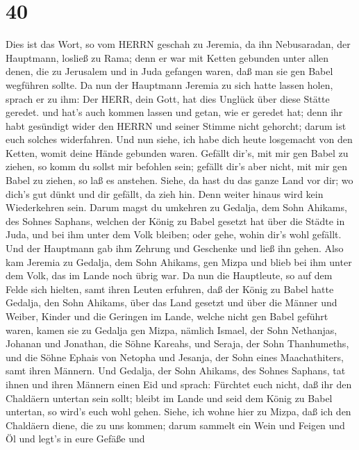 \hypertarget{section-39}{%
\section{40}\label{section-39}}

 Dies ist das Wort, so vom HERRN geschah zu Jeremia, da ihn
Nebusaradan, der Hauptmann, losließ zu Rama; denn er war mit Ketten
gebunden unter allen denen, die zu Jerusalem und in Juda gefangen waren,
daß man sie gen Babel wegführen sollte.  Da nun der
Hauptmann Jeremia zu sich hatte lassen holen, sprach er zu ihm: Der
HERR, dein Gott, hat dies Unglück über diese Stätte geredet.
 und hat's auch kommen lassen und getan, wie er geredet hat;
denn ihr habt gesündigt wider den HERRN und seiner Stimme nicht
gehorcht; darum ist euch solches widerfahren.  Und nun
siehe, ich habe dich heute losgemacht von den Ketten, womit deine Hände
gebunden waren. Gefällt dir's, mit mir gen Babel zu ziehen, so komm du
sollst mir befohlen sein; gefällt dir's aber nicht, mit mir gen Babel zu
ziehen, so laß es anstehen. Siehe, da hast du das ganze Land vor dir; wo
dich's gut dünkt und dir gefällt, da zieh hin.  Denn weiter
hinaus wird kein Wiederkehren sein. Darum magst du umkehren zu Gedalja,
dem Sohn Ahikams, des Sohnes Saphans, welchen der König zu Babel gesetzt
hat über die Städte in Juda, und bei ihm unter dem Volk bleiben; oder
gehe, wohin dir's wohl gefällt. Und der Hauptmann gab ihm Zehrung und
Geschenke und ließ ihn gehen.  Also kam Jeremia zu Gedalja,
dem Sohn Ahikams, gen Mizpa und blieb bei ihm unter dem Volk, das im
Lande noch übrig war.  Da nun die Hauptleute, so auf dem
Felde sich hielten, samt ihren Leuten erfuhren, daß der König zu Babel
hatte Gedalja, den Sohn Ahikams, über das Land gesetzt und über die
Männer und Weiber, Kinder und die Geringen im Lande, welche nicht gen
Babel geführt waren,  kamen sie zu Gedalja gen Mizpa,
nämlich Ismael, der Sohn Nethanjas, Johanan und Jonathan, die Söhne
Kareahs, und Seraja, der Sohn Thanhumeths, und die Söhne Ephais von
Netopha und Jesanja, der Sohn eines Maachathiters, samt ihren Männern.
 Und Gedalja, der Sohn Ahikams, des Sohnes Saphans, tat
ihnen und ihren Männern einen Eid und sprach: Fürchtet euch nicht, daß
ihr den Chaldäern untertan sein sollt; bleibt im Lande und seid dem
König zu Babel untertan, so wird's euch wohl gehen.  Siehe,
ich wohne hier zu Mizpa, daß ich den Chaldäern diene, die zu uns kommen;
darum sammelt ein Wein und Feigen und Öl und legt's in eure Gefäße und
